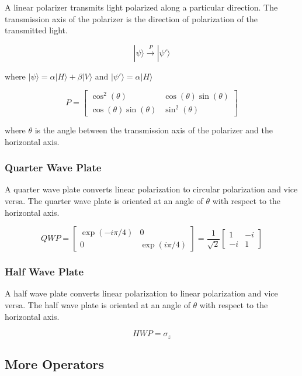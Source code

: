 \documentclass[
  letterpaper,
  DIV=11,
  numbers=noendperiod]{scrreprt}
\begin{document}
A linear polarizer transmits light polarized along a particular
direction. The transmission axis of the polarizer is the direction of
polarization of the transmitted light.

\[|\psi\rangle \overset{P}{\rightarrow} |\psi'\rangle\]

where \(|\psi\rangle = \alpha|H\rangle + \beta|V\rangle\) and
\(|\psi'\rangle = \alpha|H\rangle\)

\[ P = \begin{bmatrix} \cos^2(\theta) & \cos(\theta)\sin(\theta) \\ \cos(\theta)\sin(\theta) & \sin^2(\theta) \end{bmatrix} \]

where \(\theta\) is the angle between the transmission axis of the
polarizer and the horizontal axis.

\subsubsection*{Quarter Wave Plate}\label{quarter-wave-plate}

A quarter wave plate converts linear polarization to circular
polarization and vice versa. The quarter wave plate is oriented at an
angle of \(\theta\) with respect to the horizontal axis.

\[ QWP = \begin{bmatrix} \exp(-i\pi/4) & 0 \\ 0 & \exp(i\pi/4) \end{bmatrix} = \frac{1}{\sqrt{2}} \begin{bmatrix} 1 & -i \\ -i & 1 \end{bmatrix} \]

\subsubsection*{Half Wave Plate}\label{half-wave-plate}

A half wave plate converts linear polarization to linear polarization
and vice versa. The half wave plate is oriented at an angle of
\(\theta\) with respect to the horizontal axis.

\[HWP = \sigma_z\]

\subsection*{More Operators}\label{more-operators}
\end{document}
